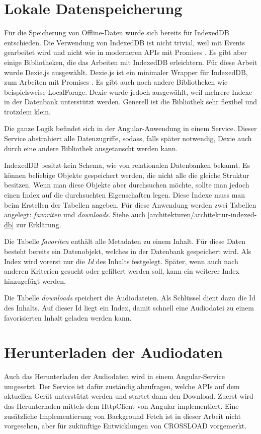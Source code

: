 \section{Lokale Datenspeicherung}
\label{Kap5:Speicherung}
Für die Speicherung von Offline-Daten wurde sich bereits für IndexedDB entschieden. Die Verwendung von IndexedDB ist nicht trivial, weil mit Events gearbeitet wird und nicht wie in moderneren APIs mit Promises \autocite{mdn-indexeddb}. Es gibt aber einige Bibliotheken, die das Arbeiten mit IndexedDB erleichtern. Für diese Arbeit wurde Dexie.js ausgewählt. Dexie.js ist ein minimaler Wrapper für IndexedDB, zum Arbeiten mit Promises \autocite{dexie}. Es gibt auch noch andere Bibliotheken wie beispielsweise LocalForage. Dexie wurde jedoch ausgewählt, weil mehrere Indexe in der Datenbank unterstützt werden. Generell ist die Bibliothek sehr flexibel und trotzdem klein.

Die ganze Logik befindet sich in der Angular-Anwendung in einem Service. Dieser Service abstrahiert alle Datenzugriffe, sodass, falls später notwendig, Dexie auch durch eine andere Bibliothek ausgetauscht werden kann. 

IndexedDB besitzt kein Schema, wie von relationalen Datenbanken bekannt. Es können beliebige Objekte gespeichert werden, die nicht alle die gleiche Struktur besitzen. Wenn man diese Objekte aber durchsuchen möchte, sollte man jedoch einen Index auf die durchsuchten Eigenschaften legen. Diese Indexe muss man beim Erstellen der Tabellen angeben. Für diese Anwendung werden zwei Tabellen angelegt: \emph{favoriten} und \emph{downloads}. Siehe auch \autoref{architekturen/architektur-indexed-db} zur Erklärung.

Die Tabelle \emph{favoriten} enthält alle Metadaten zu einem Inhalt. Für diese Daten besteht bereits ein Datenobjekt, welches in der Datenbank gespeichert wird. Als Index wird vorerst nur die \emph{Id} des Inhalts festgelegt. Später, wenn auch nach anderen Kriterien gesucht oder gefiltert werden soll, kann ein weiterer Index hinzugefügt werden. 

Die Tabelle \emph{downloads} speichert die Audiodateien. Als Schlüssel dient dazu die Id des Inhalts. Auf dieser Id liegt ein Index, damit schnell eine Audiodatei zu einem favorisierten Inhalt geladen werden kann.

\section{Herunterladen der Audiodaten}
Auch das Herunterladen der Audiodaten wird in einem Angular-Service umgesetzt. Der Service ist dafür zuständig abzufragen, welche APIs auf dem aktuellen Gerät unterstützt werden und startet dann den Download. Zuerst wird das Herunterladen mittels dem HttpClient von Angular implementiert. Eine zusätzliche Implementierung von Background Fetch ist in dieser Arbeit nicht vorgesehen, aber für zukünftige Entwicklungen von CROSSLOAD vorgemerkt. 


